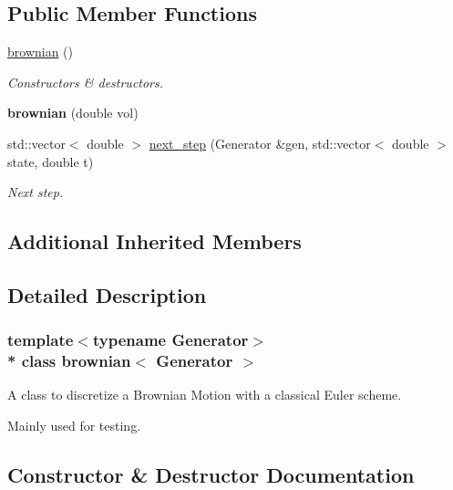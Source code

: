 \subsection*{Public Member Functions}
\begin{DoxyCompactItemize}
\item 
\hyperlink{classbrownian_ab606472ba893b778b1ad3f57553354e3}{brownian} ()
\begin{DoxyCompactList}\small\item\em Constructors \& destructors. \end{DoxyCompactList}\item 
{\bfseries brownian} (double vol)\hypertarget{classbrownian_a11a807d65dafc80cadd54ab010db996a}{}\label{classbrownian_a11a807d65dafc80cadd54ab010db996a}

\item 
std\+::vector$<$ double $>$ \hyperlink{classbrownian_afb58e5d64bc76193fcce54cf611f3671}{next\+\_\+step} (Generator \&gen, std\+::vector$<$ double $>$ state, double t)\hypertarget{classbrownian_afb58e5d64bc76193fcce54cf611f3671}{}\label{classbrownian_afb58e5d64bc76193fcce54cf611f3671}

\begin{DoxyCompactList}\small\item\em Next step. \end{DoxyCompactList}\end{DoxyCompactItemize}
\subsection*{Additional Inherited Members}


\subsection{Detailed Description}
\subsubsection*{template$<$typename Generator$>$\\*
class brownian$<$ Generator $>$}

A class to discretize a Brownian Motion with a classical Euler scheme. 

Mainly used for testing. 

\subsection{Constructor \& Destructor Documentation}
